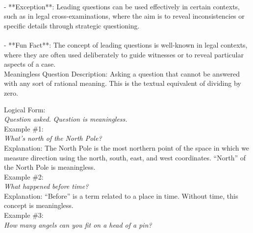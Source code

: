 \documentclass[a4paper,12pt,single,pdftex]{scrbook}
\begin{document}
    \\

    
      - **Exception**: Leading questions can be used effectively in certain contexts, such as in legal cross-examinations, where the aim is to reveal inconsistencies or specific details through strategic questioning.
    \\

    
      
    \\

    
      - **Fun Fact**: The concept of leading questions is well-known in legal contexts, where they are often used deliberately to guide witnesses or to reveal particular aspects of a case.
    \\

  

Meaningless Question
    Description: Asking a question that cannot be answered with any sort of rational meaning. This is the textual equivalent of dividing by zero.

    
      Logical Form:
    \\

    
      {\em Question asked.} \newline
{\em Question is meaningless.}
    \\

    
      Example \#1:
    \\

    
      {\em What’s north of the North Pole?}
    \\

    
      Explanation: The North Pole is the most northern point of the space in which we measure direction using the north, south, east, and west coordinates. “North” of the North Pole is meaningless.
    \\

    
      Example \#2:
    \\

    
      {\em What happened before time?}
    \\

    
      Explanation: “Before” is a term related to a place in time. Without time, this concept is meaningless.
    \\

    
      Example \#3:
    \\

    
      {\em How many angels can you fit on a head of a pin?}
    \\
\end{document}
